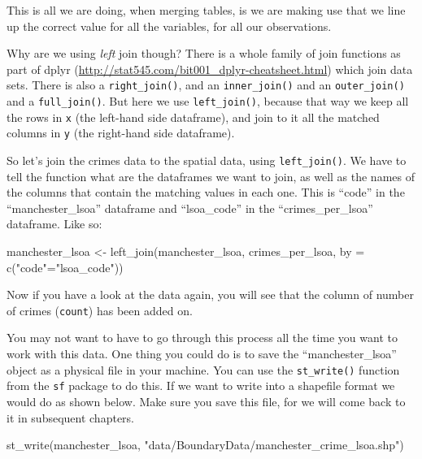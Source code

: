 \documentclass[
]{book}
\makeatletter
\newenvironment{Shaded}{\begin{snugshade}}{\end{snugshade}}
\newcommand{\AttributeTok}[1]{\textcolor[rgb]{0.61,0.61,0.61}{#1}}
\newcommand{\FunctionTok}[1]{\textcolor[rgb]{0,0,0}{#1}}
\newcommand{\NormalTok}[1]{#1}
\newcommand{\OtherTok}[1]{\textcolor[rgb]{0.37,0.37,0.37}{#1}}
\newcommand{\StringTok}[1]{\textcolor[rgb]{0.5,0.5,0.5}{#1}}
\newenvironment{kframe}{%
\medskip{}
\setlength{\fboxsep}{.8em}
 \def\at@end@of@kframe{}%
 \ifinner\ifhmode%
  \def\at@end@of@kframe{\end{minipage}}%
  \begin{minipage}{\columnwidth}%
 \fi\fi%
 \def\FrameCommand##1{\hskip\@totalleftmargin \hskip-\fboxsep
 \colorbox{shadecolor}{##1}\hskip-\fboxsep
     \hskip-\linewidth \hskip-\@totalleftmargin \hskip\columnwidth}%
 \MakeFramed {\advance\hsize-\width
   \@totalleftmargin\z@ \linewidth\hsize
   \@setminipage}}%
 {\par\unskip\endMakeFramed%
 \at@end@of@kframe}
\renewenvironment{Shaded}{\begin{kframe}}{\end{kframe}}
\makeatother
\begin{document}
This is all we are doing, when merging tables, is we are making use that we line up the correct value for all the variables, for all our observations.

Why are we using \emph{left} join though? There is a whole family of join functions as part of dplyr (\url{http://stat545.com/bit001_dplyr-cheatsheet.html}) which join data sets. There is also a \texttt{right\_join()}, and an \texttt{inner\_join()} and an \texttt{outer\_join()} and a \texttt{full\_join()}. But here we use \texttt{left\_join()}, because that way we keep all the rows in \texttt{x} (the left-hand side dataframe), and join to it all the matched columns in \texttt{y} (the right-hand side dataframe).

So let's join the crimes data to the spatial data, using \texttt{left\_join()}. We have to tell the function what are the dataframes we want to join, as well as the names of the columns that contain the matching values in each one. This is ``code'' in the ``manchester\_lsoa'' dataframe and ``lsoa\_code'' in the ``crimes\_per\_lsoa'' dataframe. Like so:

\begin{Shaded}
\begin{Highlighting}[]
\NormalTok{manchester\_lsoa }\OtherTok{\textless{}{-}} \FunctionTok{left\_join}\NormalTok{(manchester\_lsoa, crimes\_per\_lsoa, }
                             \AttributeTok{by =} \FunctionTok{c}\NormalTok{(}\StringTok{"code"}\OtherTok{=}\StringTok{"lsoa\_code"}\NormalTok{))}
\end{Highlighting}
\end{Shaded}

Now if you have a look at the data again, you will see that the column of number of crimes (\texttt{count}) has been added on.

You may not want to have to go through this process all the time you want to work with this data. One thing you could do is to save the ``manchester\_lsoa'' object as a physical file in your machine. You can use the \texttt{st\_write()} function from the \texttt{sf} package to do this. If we want to write into a shapefile format we would do as shown below. Make sure you save this file, for we will come back to it in subsequent chapters.

\begin{Shaded}
\begin{Highlighting}[]
\FunctionTok{st\_write}\NormalTok{(manchester\_lsoa, }
         \StringTok{"data/BoundaryData/manchester\_crime\_lsoa.shp"}\NormalTok{)}
\end{Highlighting}
\end{Shaded}
\end{document}

